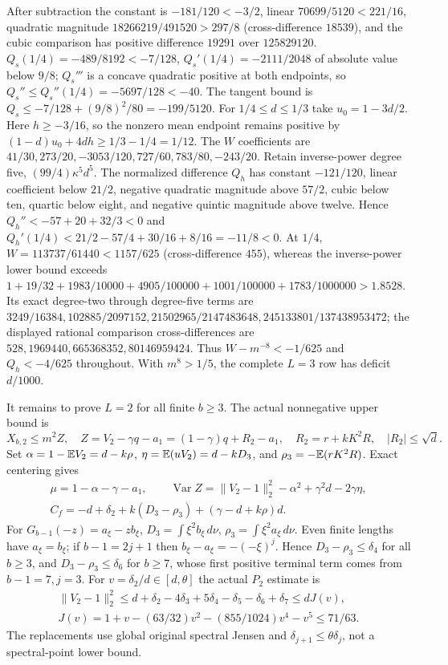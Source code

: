 After subtraction the constant is $-181/120<-3/2$, linear
$70699/5120<221/16$, quadratic magnitude
$18266219/491520>297/8$ (cross-difference $18539$), and the cubic
comparison has positive difference $19291$ over $125829120$.
$Q_s(1/4)=-489/8192<-7/128$,
$Q_s'(1/4)=-2111/2048$ of absolute value below $9/8$;
$Q_s'''$ is a concave quadratic positive at both endpoints, so
$Q_s''\le Q_s''(1/4)=-5697/128<-40$.
The tangent bound is $Q_s\le-7/128+(9/8)^2/80=-199/5120$.
For $1/4\le d\le1/3$ take $u_0=1-3d/2$.
Here $h\ge-3/16$, so the nonzero mean endpoint remains positive
by $(1-d)u_0+4dh\ge1/3-1/4=1/12$.
The $W$ coefficients are
$41/30,\allowbreak 273/20,\allowbreak -3053/120,\allowbreak 727/60,\allowbreak 783/80,\allowbreak -243/20$.
Retain inverse-power degree five, $(99/4)\kappa^5d^5$.
The normalized difference $Q_h$ has constant $-121/120$, linear
coefficient below $21/2$, negative quadratic magnitude above $57/2$,
cubic below ten, quartic below eight, and negative quintic magnitude
above twelve. Hence $Q_h''<-57+20+32/3<0$ and
$Q_h'(1/4)<21/2-57/4+30/16+8/16=-11/8<0$.
At $1/4$, $W=113737/61440<1157/625$ (cross-difference $455$),
whereas the inverse-power lower bound exceeds
$1+19/32+1983/10000+4905/100000+1001/100000+1783/1000000>1.8528$.
Its exact degree-two through degree-five terms are
$3249/16384,\allowbreak 102885/2097152,\allowbreak 21502965/2147483648,\allowbreak 
245133801/137438953472$; the displayed rational comparison
cross-differences are $528,1969440,665368352,80146959424$.
Thus $W-m^{-8}<-1/625$ and $Q_h<-4/625$ throughout.
With $m^8>1/5$, the complete $L=3$ row has deficit $d/1000$.

It remains to prove $L=2$ for all finite $b\ge3$.
The actual nonnegative upper bound is
\begin{equation}\tag{L58.12.1}\label{eq:L58:two}
X_{b,2}\le m^2Z,\quad Z=V_2-\gamma q-a_1
=(1-\gamma)q+R_2-a_1,\quad R_2=r+kK^2R,\quad |R_2|\le\sqrt d.
\end{equation}
Set $\alpha=1-\mathbb E V_2=d-k\rho$,
$\eta=\mathbb E(uV_2)=d-kD_3$, and
$\rho_3=-\mathbb E(rK^2R)$. Exact centering gives
\begin{equation}\tag{L58.12.2}\label{eq:L58:twomoments}
\begin{gathered}
\mu=1-\alpha-\gamma-a_1,\qquad
\operatorname{Var}Z=\|V_2-1\|_2^2-\alpha^2+\gamma^2d-2\gamma\eta,\\
C_f=-d+\delta_2+k(D_3-\rho_3)+(\gamma-d+k\rho)d.
\end{gathered}
\end{equation}
For $G_{b-1}(-z)=a_\xi-zb_\xi$,
$D_3=\int\xi^2b_\xi\,d\nu$, $\rho_3=\int\xi^2a_\xi\,d\nu$.
Even finite lengths have $a_\xi=b_\xi$; if $b-1=2j+1$ then
$b_\xi-a_\xi=-(-\xi)^j$.
Hence $D_3-\rho_3\le\delta_4$ for all $b\ge3$, and
$D_3-\rho_3\le\delta_6$ for $b\ge7$, whose first positive terminal
term comes from $b-1=7,j=3$.
For $v=\delta_2/d\in[d,\theta]$ the actual $P_2$ estimate is
\[
\begin{gathered}
\|V_2-1\|_2^2\le d+\delta_2-4\delta_3+5\delta_4
-\delta_5-\delta_6+\delta_7\le dJ(v),\\
J(v)=1+v-(63/32)v^2-(855/1024)v^4-v^5\le71/63.
\end{gathered}
\]
The replacements use global original spectral Jensen and
$\delta_{j+1}\le\theta\delta_j$, not a spectral-point lower bound.

